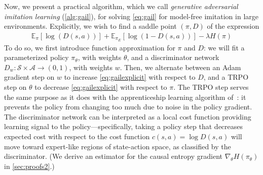 \documentclass{article}
\newcommand\bbE{\ensuremath{\mathbb{E}}} %
\newcommand\psiga{\ensuremath{\psi_\text{GA}}}
\newcommand{\1}{\mathbb{I}} %
\begin{document}


Now, we present a practical algorithm, which we call \emph{generative adversarial imitation learning} (\cref{alg:gail}), for solving \cref{eq:gail} for model-free imitation in large environments.
Explicitly, we wish to find a saddle point $(\pi, D)$ of the expression
\begin{align}
\bbE_{\pi}[\log(D(s,a))] + \bbE_{\pi_E}[\log(1-D(s,a))] - \lambda H(\pi) \label{eq:gailexplicit}
\end{align}
To do so, we first introduce function approximation for $\pi$ and $D$:
we will fit a parameterized policy $\pi_\theta$, with weights $\theta$, and a discriminator network $D_w : \mathcal{S}\times\mathcal{A}\rightarrow (0,1)$, with weights $w$.
Then, we alternate between an Adam~\citep{kingma2014adam} gradient step on $w$ to increase \cref{eq:gailexplicit} with respect to $D$,
and a TRPO step on $\theta$ to decrease \cref{eq:gailexplicit} with respect to $\pi$.
The TRPO step serves the same purpose as it does with the apprenticeship learning algorithm of~\citet{ho2016model}:
it prevents the policy from changing too much due to noise in the policy gradient.
The discriminator network can be interpreted as a local cost function providing learning signal to the policy---specifically,
taking a policy step that decreases expected cost with respect to the cost function $c(s,a) = \log D(s,a)$
will move toward expert-like regions of state-action space, as classified by the discriminator.
(We derive an estimator for the causal entropy gradient $\nabla_\theta H(\pi_\theta)$ in \cref{sec:proofs2}.)
\end{document}

